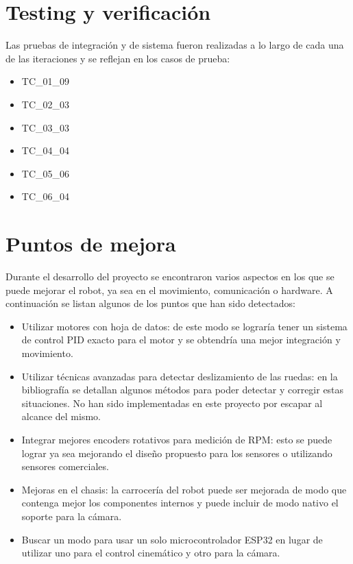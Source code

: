 \section{Testing y verificación}

Las pruebas de integración y de sistema fueron realizadas a lo largo de cada una de las iteraciones y se reflejan en los casos de prueba:

\begin{itemize}
    \item TC\_01\_09
    \item TC\_02\_03
    \item TC\_03\_03
    \item TC\_04\_04
    \item TC\_05\_06
    \item TC\_06\_04
\end{itemize}


\section{Puntos de mejora}

Durante el desarrollo del proyecto se encontraron varios aspectos en los que se puede mejorar el robot, ya sea en el movimiento, comunicación o hardware. A continuación se listan algunos de los puntos que han sido detectados:

\begin{itemize}
    \item Utilizar motores con hoja de datos: de este modo se lograría tener un sistema de control PID exacto para el motor y se obtendría una mejor integración y movimiento.

    \item Utilizar técnicas avanzadas para detectar deslizamiento de las ruedas: en la bibliografía \cite{phunopasomnirobot} \cite{palacinodometry} se detallan algunos métodos para poder detectar y corregir estas situaciones. No han sido implementadas en este proyecto por escapar al alcance del mismo.
    
    \item Integrar mejores encoders rotativos para medición de RPM: esto se puede lograr ya sea mejorando el diseño propuesto para los sensores o utilizando sensores comerciales.
    
    \item Mejoras en el chasis: la carrocería del robot puede ser mejorada de modo que contenga mejor los componentes internos y puede incluir de modo nativo el soporte para la cámara.
    
    \item Buscar un modo para usar un solo microcontrolador ESP32 en lugar de utilizar uno para el control cinemático y otro para la cámara.
\end{itemize}
